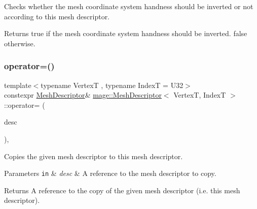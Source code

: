 Checks whether the mesh coordinate system handness should be inverted or not according to this mesh descriptor.

\begin{DoxyReturn}{Returns}
{\ttfamily true} if the mesh coordinate system handness should be inverted. {\ttfamily false} otherwise. 
\end{DoxyReturn}
\hypertarget{classmage_1_1_mesh_descriptor_a022e345285b4d307e69ddafe6a478a97}{}\label{classmage_1_1_mesh_descriptor_a022e345285b4d307e69ddafe6a478a97} 
\subsubsection{\texorpdfstring{operator=()}{operator=()}\hspace{0.1cm}{\footnotesize\ttfamily [1/2]}}
{\footnotesize\ttfamily template$<$typename VertexT , typename IndexT  = U32$>$ \\
constexpr \hyperlink{classmage_1_1_mesh_descriptor}{Mesh\+Descriptor}\& \hyperlink{classmage_1_1_mesh_descriptor}{mage\+::\+Mesh\+Descriptor}$<$ VertexT, IndexT $>$\+::operator= (\begin{DoxyParamCaption}\item[{const \hyperlink{classmage_1_1_mesh_descriptor}{Mesh\+Descriptor}$<$ VertexT, IndexT $>$ \&}]{desc }\end{DoxyParamCaption})\hspace{0.3cm}{\ttfamily [default]}, {\ttfamily [noexcept]}}

Copies the given mesh descriptor to this mesh descriptor.


\begin{DoxyParams}[1]{Parameters}
\mbox{\tt in}  & {\em desc} & A reference to the mesh descriptor to copy. \\
\hline
\end{DoxyParams}
\begin{DoxyReturn}{Returns}
A reference to the copy of the given mesh descriptor (i.\+e. this mesh descriptor). 
\end{DoxyReturn}
\hypertarget{classmage_1_1_mesh_descriptor_abc2aa63cc03fd7b7ca736129bd5bc0fd}{}\label{classmage_1_1_mesh_descriptor_abc2aa63cc03fd7b7ca736129bd5bc0fd} 
